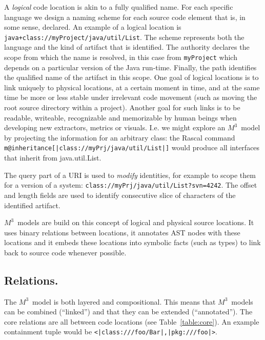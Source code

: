 \documentclass[conference]{IEEEtran}
\newcommand{\loc}[1]{\small{\texttt{#1}}\xspace}
\newcommand{\mthree}{\ensuremath{M^3}\xspace}
\begin{document}
A \emph{logical} code location is akin to a fully qualified name. For each
specific language we design a naming scheme for each source code element that
is, in some sense, declared. An example of a logical location is
\loc{java+class://myProject/java/util/List}. The scheme represents both the
language and the kind of artifact that is identified. The authority declares
the scope from which the name is resolved, in this case from
\texttt{myProject} which depends on a particular version of the Java run-time.
Finally, the path identifies the qualified name of the artifact in this scope.
One goal of logical locations is to link uniquely to physical locations, at a
certain moment in time, and at the same time be more or less stable under
irrelevant code movement (such as moving the root source directory within a
project). Another goal for such links is to be readable, writeable,
recognizable and memorizable by human beings when developing new extractors,
metrics or visuals. I.e. we might explore an \mthree\ model by projecting the
information for an arbitrary class: the Rascal command
\texttt{m@inheritance[|class://myPrj/java/util/List|]} would produce all
interfaces that inherit from java.util.List.

The query part of a URI is used to \emph{modify} identities, for example to
scope them for a version of a system:
\loc{class://myPrj/java/util/List?svn=4242}. The offset and length fields are
used to identify consecutive slice of characters of the identified artifact.

\mthree\ models are build on this concept of logical and physical source
locations. It uses binary relations between locations, it annotates AST nodes
with these locations and it embeds these locations into symbolic facts (such
as types) to link back to source code whenever possible.

\subsection{Relations.} The \mthree\  model is both layered and compositional.
This means that \mthree\ models can be combined (``linked'') and that they can
be extended (``annotated''). The core relations are all between code
locations (see Table~\ref{table:core}). An example containment
tuple would be \loc{<|class:///foo/Bar|,|pkg:///foo|>}.
\end{document}
